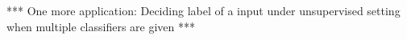*** One more application: Deciding label of a input under unsupervised setting when multiple classifiers are given ***





